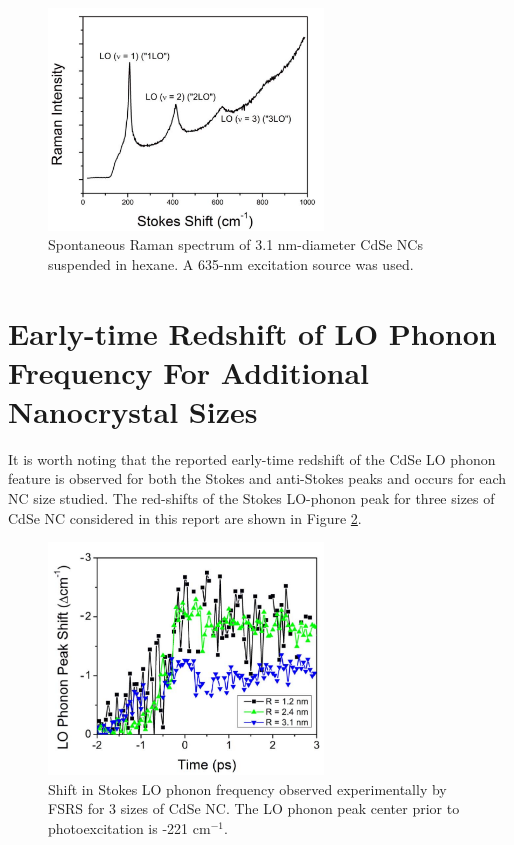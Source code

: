 \begin{figure}
\begin{center}
\includegraphics[width=0.65\textwidth]{./appendixB/fsrssup3.png}
\caption[Resonant spontaneous Raman scattering from CdSe NCs.]{Spontaneous Raman spectrum of 3.1 nm-diameter CdSe NCs suspended in hexane. A 635-nm excitation source was used.}
\label{f:fsrssup3}
\end{center}
\end{figure}

\section{Early-time Redshift of LO Phonon Frequency For Additional Nanocrystal Sizes}
It is worth noting that the reported early-time redshift of the CdSe LO phonon feature is observed for both the Stokes and anti-Stokes peaks and occurs for each NC size studied. The red-shifts of the Stokes LO-phonon peak for three sizes of CdSe NC considered in this report are shown in Figure \ref{f:fsrssup4}.

\begin{figure}
\begin{center}
\includegraphics[width=0.65\textwidth]{./appendixB/fsrssup4.png}
\caption[Transient LO phonon softening for a variety of CdSe NC sizes.]{Shift in Stokes LO phonon frequency observed experimentally by FSRS for 3 sizes of CdSe NC. The LO phonon peak center prior to photoexcitation is -221 cm$^{-1}$.}
\label{f:fsrssup4}
\end{center}
\end{figure}

